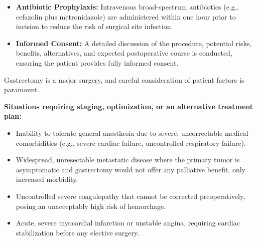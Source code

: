 \begin{itemize}
  \item \textbf{Antibiotic Prophylaxis:} Intravenous broad-spectrum antibiotics (e.g., cefazolin plus metronidazole) are administered within one hour prior to incision to reduce the risk of surgical site infection.
  \item \textbf{Informed Consent:} A detailed discussion of the procedure, potential risks, benefits, alternatives, and expected postoperative course is conducted, ensuring the patient provides fully informed consent.
\end{itemize}

Gastrectomy is a major surgery, and careful consideration of patient factors is paramount.

\textbf{Situations requiring staging, optimization, or an alternative treatment plan:}
\begin{itemize}
  \item Inability to tolerate general anesthesia due to severe, uncorrectable medical comorbidities (e.g., severe cardiac failure, uncontrolled respiratory failure).
  \item Widespread, unresectable metastatic disease where the primary tumor is asymptomatic and gastrectomy would not offer any palliative benefit, only increased morbidity.
  \item Uncontrolled severe coagulopathy that cannot be corrected preoperatively, posing an unacceptably high risk of hemorrhage.
  \item Acute, severe myocardial infarction or unstable angina, requiring cardiac stabilization before any elective surgery.
\end{itemize}


